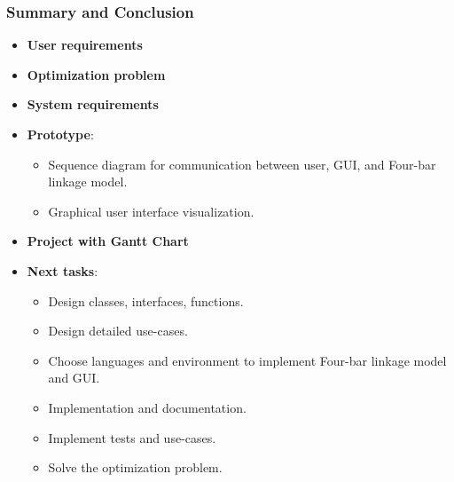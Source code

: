 \documentclass[ucs,10pt]{beamer}
\begin{document}
\begin{frame}
\frametitle{Summary and Conclusion}
    \begin{itemize}
        \item \textbf{User requirements}
        \item \textbf{Optimization problem}
        \item \textbf{System requirements}
        \item \textbf{Prototype}:
        \begin{itemize}
            \item Sequence diagram for communication between user, GUI, and Four-bar linkage model.
            \item Graphical user interface visualization.
        \end{itemize}
        \item \textbf{Project  with Gantt Chart}
        \item \textbf{Next tasks}:
        \begin{itemize}
            \item Design classes, interfaces, functions.
            \item Design detailed use-cases.
            \item Choose languages and environment to implement Four-bar linkage model and GUI.
            \item Implementation and documentation.
            \item Implement tests and use-cases.
            \item Solve the optimization problem.
        \end{itemize}
    \end{itemize}
\end{frame}
\end{document}
